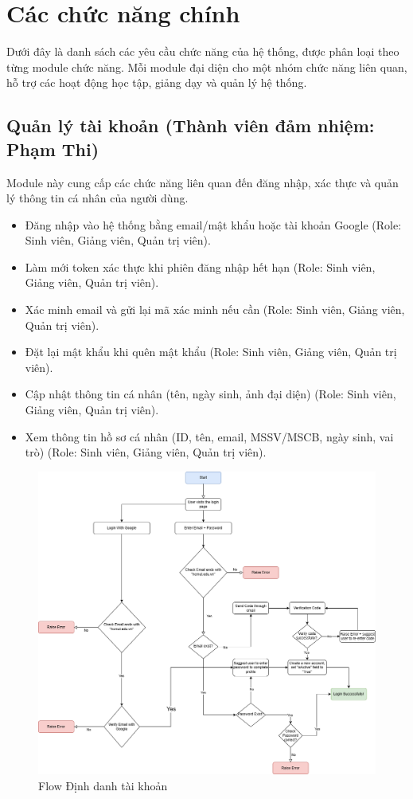 \section{Các chức năng chính}
Dưới đây là danh sách các yêu cầu chức năng của hệ thống, được phân loại theo từng module chức năng. Mỗi module đại diện cho một nhóm chức năng liên quan, hỗ trợ các hoạt động học tập, giảng dạy và quản lý hệ thống.

\subsection{Quản lý tài khoản (Thành viên đảm nhiệm: Phạm Thi)}
Module này cung cấp các chức năng liên quan đến đăng nhập, xác thực và quản lý thông tin cá nhân của người dùng.
\begin{itemize}[label=--]
    \item Đăng nhập vào hệ thống bằng email/mật khẩu hoặc tài khoản Google (Role: Sinh viên, Giảng viên, Quản trị viên).
    \item Làm mới token xác thực khi phiên đăng nhập hết hạn (Role: Sinh viên, Giảng viên, Quản trị viên).
    \item Xác minh email và gửi lại mã xác minh nếu cần (Role: Sinh viên, Giảng viên, Quản trị viên).
    \item Đặt lại mật khẩu khi quên mật khẩu (Role: Sinh viên, Giảng viên, Quản trị viên).
    \item Cập nhật thông tin cá nhân (tên, ngày sinh, ảnh đại diện) (Role: Sinh viên, Giảng viên, Quản trị viên).
    \item Xem thông tin hồ sơ cá nhân (ID, tên, email, MSSV/MSCB, ngày sinh, vai trò) (Role: Sinh viên, Giảng viên, Quản trị viên).
\end{itemize}

\begin{figure}[H]
    \centering
    \includegraphics[width=0.9\linewidth]{images/Quan_ly_tai_khoan/authenFlow.drawio.png}
    \caption{Flow Định danh tài khoản}
    \label{fig:enter-label}
\end{figure}

